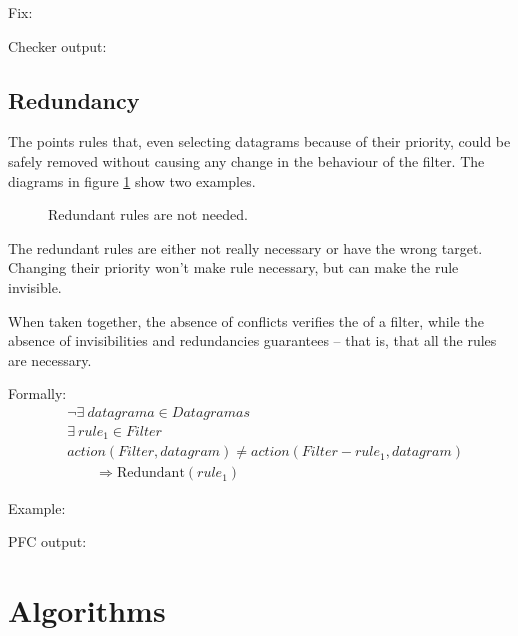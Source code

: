 Fix:



Checker output:





\subsection{Redundancy}


The  points rules that, even selecting datagrams
because of their priority, could be safely removed without causing any change in
the behaviour of the filter. The diagrams in figure \ref{fig:exrredundant} show
two examples.

\begin{figure}
	\caption{\label{fig:exrredundant}Redundant rules are not needed.}
\end{figure}

The redundant rules are either not really necessary or have the wrong target.
Changing their priority won't make rule necessary, but can make the rule
invisible.

When taken together, the absence of conflicts verifies the
 of a filter, while the absence of invisibilities and
redundancies guarantees  -- that is, that all the
rules are necessary.

Formally:
\begin{align*}
	& \lnot\exists ~ datagrama \in Datagramas \\
	& \exists ~ rule_1 \in Filter \\
	& action(Filter, datagram) \not= action(Filter - rule_1, datagram) \\
	& \qquad \Rightarrow \mbox{Redundant}(rule_1)
\end{align*}

Example:



PFC output:





\section{Algorithms}

